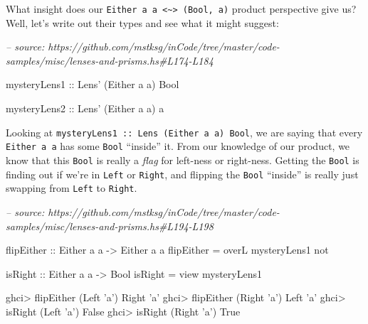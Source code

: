 \documentclass[]{article}
\newenvironment{Shaded}{}{}
\newcommand{\CharTok}[1]{\textcolor[rgb]{0.25,0.44,0.63}{#1}}
\newcommand{\CommentTok}[1]{\textcolor[rgb]{0.38,0.63,0.69}{\textit{#1}}}
\newcommand{\DataTypeTok}[1]{\textcolor[rgb]{0.56,0.13,0.00}{#1}}
\newcommand{\FunctionTok}[1]{\textcolor[rgb]{0.02,0.16,0.49}{#1}}
\newcommand{\NormalTok}[1]{#1}
\newcommand{\OtherTok}[1]{\textcolor[rgb]{0.00,0.44,0.13}{#1}}
\begin{document}
What insight does our
\texttt{Either\ a\ a\ \textless{}\textasciitilde{}\textgreater{}\ (Bool,\ a)}
product perspective give us? Well, let's write out their types and see what it
might suggest:

\begin{Shaded}
\begin{Highlighting}[]
\CommentTok{-- source: https://github.com/mstksg/inCode/tree/master/code-samples/misc/lenses-and-prisms.hs#L174-L184}

\OtherTok{mysteryLens1 ::} \DataTypeTok{Lens'}\NormalTok{ (}\DataTypeTok{Either}\NormalTok{ a a) }\DataTypeTok{Bool}

\OtherTok{mysteryLens2 ::} \DataTypeTok{Lens'}\NormalTok{ (}\DataTypeTok{Either}\NormalTok{ a a) a}
\end{Highlighting}
\end{Shaded}

Looking at
\texttt{mysteryLens1\ ::\ Lens\textquotesingle{}\ (Either\ a\ a)\ Bool}, we are
saying that every \texttt{Either\ a\ a} has some \texttt{Bool} ``inside'' it.
From our knowledge of our product, we know that this \texttt{Bool} is really a
\emph{flag} for left-ness or right-ness. Getting the \texttt{Bool} is finding
out if we're in \texttt{Left} or \texttt{Right}, and flipping the \texttt{Bool}
``inside'' is really just swapping from \texttt{Left} to \texttt{Right}.

\begin{Shaded}
\begin{Highlighting}[]
\CommentTok{-- source: https://github.com/mstksg/inCode/tree/master/code-samples/misc/lenses-and-prisms.hs#L194-L198}

\OtherTok{flipEither ::} \DataTypeTok{Either}\NormalTok{ a a }\OtherTok{->} \DataTypeTok{Either}\NormalTok{ a a}
\NormalTok{flipEither }\FunctionTok{=}\NormalTok{ overL mysteryLens1 }\FunctionTok{not}

\OtherTok{isRight ::} \DataTypeTok{Either}\NormalTok{ a a }\OtherTok{->} \DataTypeTok{Bool}
\NormalTok{isRight }\FunctionTok{=}\NormalTok{ view mysteryLens1}
\end{Highlighting}
\end{Shaded}

\begin{Shaded}
\begin{Highlighting}[]
\NormalTok{ghci}\FunctionTok{>}\NormalTok{ flipEither (}\DataTypeTok{Left} \CharTok{'a'}\NormalTok{)}
\DataTypeTok{Right} \CharTok{'a'}
\NormalTok{ghci}\FunctionTok{>}\NormalTok{ flipEither (}\DataTypeTok{Right} \CharTok{'a'}\NormalTok{)}
\DataTypeTok{Left} \CharTok{'a'}
\NormalTok{ghci}\FunctionTok{>}\NormalTok{ isRight (}\DataTypeTok{Left} \CharTok{'a'}\NormalTok{)}
\DataTypeTok{False}
\NormalTok{ghci}\FunctionTok{>}\NormalTok{ isRight (}\DataTypeTok{Right} \CharTok{'a'}\NormalTok{)}
\DataTypeTok{True}
\end{Highlighting}
\end{Shaded}
\end{document}
